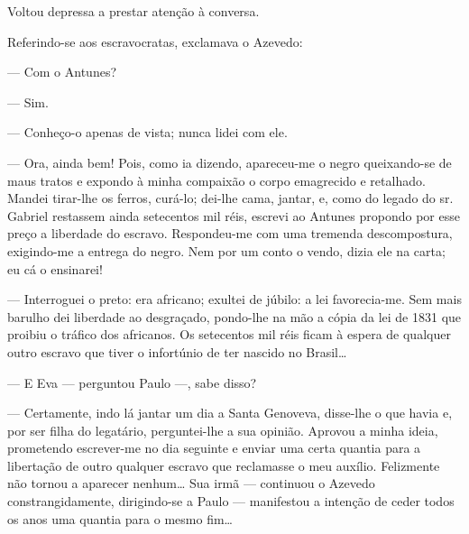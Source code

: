 {Voltou depressa a prestar atenção à conversa.

Referindo-se aos escravocratas, exclamava o Azevedo:


--- Com o Antunes?

--- Sim.

--- Conheço-o apenas de vista; nunca lidei com ele.

--- Ora, ainda bem! Pois, como ia dizendo, apareceu-me o negro
queixando-se de maus tratos e expondo à minha compaixão o corpo
emagrecido e retalhado. Mandei tirar-lhe os ferros, curá-lo; dei-lhe
cama, jantar, e, como do legado do sr.\,Gabriel restassem ainda
setecentos mil réis, escrevi ao Antunes propondo por esse preço a
liberdade do escravo. Respondeu-me com uma tremenda descompostura,
exigindo-me a entrega do negro. Nem por um conto o vendo, dizia ele na
carta; eu cá o ensinarei!

--- Interroguei o preto: era africano; exultei de júbilo: a lei
favorecia-me. Sem mais barulho dei liberdade ao desgraçado, pondo-lhe na
mão a cópia da lei de 1831 que proibiu o tráfico dos africanos. Os
setecentos mil réis ficam à espera de qualquer outro escravo que tiver o
infortúnio de ter nascido no Brasil\ldots{}



--- E Eva --- perguntou Paulo ---, sabe disso?

--- Certamente, indo lá jantar um dia a Santa Genoveva,
disse-lhe o que havia e, por ser filha do legatário, perguntei-lhe a sua
opinião. Aprovou a minha ideia, prometendo escrever-me no dia seguinte e
enviar uma certa quantia para a libertação de outro qualquer escravo que
reclamasse o meu auxílio. Felizmente não tornou a aparecer nenhum\ldots{} Sua
irmã --- continuou o Azevedo constrangidamente, dirigindo-se a Paulo ---
manifestou a intenção de ceder todos os anos uma quantia para o mesmo
fim\ldots{}

}
